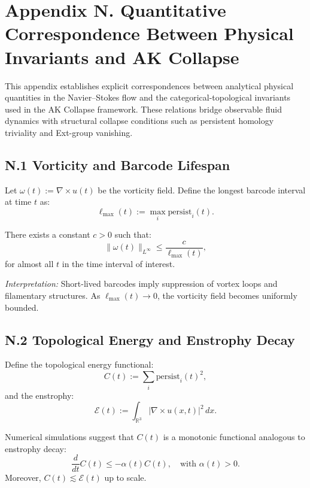 \documentclass[11pt]{article}
\theoremstyle{definition}
\begin{document}
\section*{Appendix N. Quantitative Correspondence Between Physical Invariants and AK Collapse}

This appendix establishes explicit correspondences between analytical physical quantities in the Navier--Stokes flow and the categorical-topological invariants used in the AK Collapse framework. These relations bridge observable fluid dynamics with structural collapse conditions such as persistent homology triviality and Ext-group vanishing.

\subsection*{N.1 Vorticity and Barcode Lifespan}

Let \( \omega(t) := \nabla \times u(t) \) be the vorticity field. Define the longest barcode interval at time \( t \) as:
\[
\ell_{\max}(t) := \max_{i} \mathrm{persist}_i(t).
\]

\begin{conjecture}
There exists a constant \( c > 0 \) such that:
\[
\|\omega(t)\|_{L^\infty} \leq \frac{c}{\ell_{\max}(t)},
\]
for almost all \( t \) in the time interval of interest.
\end{conjecture}

\textit{Interpretation:} Short-lived barcodes imply suppression of vortex loops and filamentary structures. As \( \ell_{\max}(t) \to 0 \), the vorticity field becomes uniformly bounded.

\subsection*{N.2 Topological Energy and Enstrophy Decay}

Define the topological energy functional:
\[
C(t) := \sum_i \mathrm{persist}_i(t)^2,
\]
and the enstrophy:
\[
\mathcal{E}(t) := \int_{\mathbb{R}^3} |\nabla \times u(x,t)|^2 \, dx.
\]

\begin{observation}
Numerical simulations suggest that \( C(t) \) is a monotonic functional analogous to enstrophy decay:
\[
\frac{d}{dt} C(t) \leq -\alpha(t) C(t), \quad \text{with } \alpha(t) > 0.
\]
Moreover, \( C(t) \lesssim \mathcal{E}(t) \) up to scale.
\end{observation}
\end{document}
